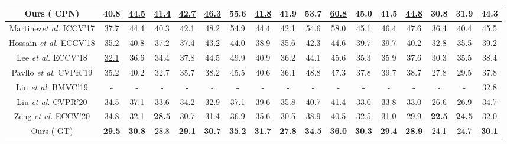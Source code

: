 \documentclass[sigconf]{acmart}
\begin{document}
\begin{table*}[ht]
\begin{tabular}{c|ccccccccccccccc|c}
    \midrule
    Ours ( CPN)  &40.8&\underline{44.5}&\underline{41.4}&\underline{42.7}&\underline{46.3}&55.6&\underline{41.8}&41.9&53.7&\underline{60.8}&\textbf{45.0}&\textbf{41.5}&\underline{44.8}&\textbf{30.8}&\textbf{31.9}&\textbf{44.3}\\
    \midrule
    \midrule
    Martinez\textit{et al.} \cite{martinez2017simple} ICCV'17 &37.7&44.4&40.3&42.1&48.2&54.9&44.4&42.1&54.6&58.0&45.1&46.4&47.6&36.4&40.4&45.5 \\
    Hossain \textit{et al.} \cite{hossain2018exploiting} ECCV'18 &35.2&40.8&37.2&37.4&43.2&44.0&38.9&35.6&42.3&44.6&39.7&39.7&40.2&32.8&35.5&39.2  \\
    Lee \textit{et al.} \cite{lee2018propagating} ECCV'18 &\underline{32.1}&36.6&34.4&37.8&44.5&49.9&40.9&36.2&44.1&45.6&35.3&35.9&37.6&30.3&35.5&38.4  \\
    Pavllo \textit{et al.} \cite{jllo20193d} CVPR'19 &35.2&40.2&32.7&35.7&38.2&45.5&40.6&36.1&48.8&47.3&37.8&39.7&38.7&27.8&29.5&37.8  \\
    Lin \textit{et al.} \cite{lin2019trajectory} BMVC'19& -&-&-&-&-&-&-&-&-&-&-&-&-&-&-&32.8 \\
    Liu \textit{et al.} \cite{liu2020attention} CVPR'20 &34.5&37.1&33.6&34.2&32.9&37.1&39.6&35.8&40.7&41.4&33.0&33.8&33.0&26.6&26.9&34.7   \\
    Zeng \textit{et al.} \cite{zeng2020srnet} ECCV'20 &34.8&\underline{32.1}&\textbf{28.5}&\underline{30.7}&\underline{31.4}&\underline{36.9}&\underline{35.6}&\underline{30.5}&\underline{38.9}&\underline{40.5}&\underline{32.5}&\underline{31.0}&\underline{29.9}&\textbf{22.5}&\textbf{24.5}&\underline{32.0}   \\
    \midrule
    Ours ( GT)  & \textbf{29.5}&\textbf{30.8}&\underline{28.8}&\textbf{29.1}&\textbf{30.7}&\textbf{35.2}&\textbf{31.7}&\textbf{27.8}&\textbf{34.5}&\textbf{36.0}&\textbf{30.3}&\textbf{29.4}&\textbf{28.9}&\underline{24.1}&\underline{24.7}&\textbf{30.1}\\
    \bottomrule
    \end{tabular}
  \label{tab1}
\end{table*}
\end{document}

